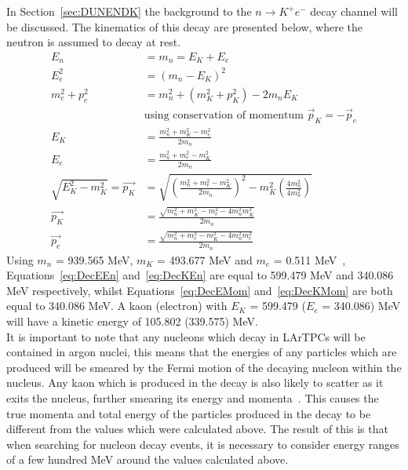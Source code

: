 In Section~\ref{sec:DUNENDK} the background to the $n \rightarrow K^{+} e^{-}$ decay channel will be discussed. The kinematics of this decay are presented below, where the neutron is assumed to decay at rest.
\begin{align}
  E_{n} &= m_{n} = E_{K} + E_{e} \nonumber \\
  E_{e}^{2} &= (m_{n} - E_{K})^{2} \nonumber \\
  m_{e}^{2} + p_{e}^{2} &= m_{n}^{2} + (m_{K}^{2} + p_{K}^{2}) - 2m_{n}E_{K} \nonumber \\
  &\text{using conservation of momentum $\vec{p}_{K} = -\vec{p}_{e}$} \nonumber \\  
  E_{K} &= \frac{m_n^{2} + m_{K}^{2} - m_{e}^{2}}{2m_{n}} \label{eq:DecKEn} \\
  E_{e} &= \frac{m_n^{2} + m_{e}^{2} - m_{K}^{2}}{2m_{n}} \label{eq:DecEEn} \\
  \sqrt{E_{K}^{2} - m_{K}^{2}} = \vec{p_{K}} &= \sqrt{ \left(\frac{m_n^{2} + m_{e}^{2} - m_{K}^{2}}{2m_{n}}\right)^{2} - m_{K}^{2}\left(\frac{4m_{n}^2}{4m_n^{2}}\right) } \nonumber \\
  \vec{p_{K}} &= \frac{ \sqrt{m_n^{2} + m_{K}^{2} - m_{e}^{2} - 4m_{n}^{2}m_{K}^{2} } }{ 2m_{n} } \label{eq:DecEMom} \\
  \vec{p_{e}} &= \frac{ \sqrt{m_n^{2} + m_{e}^{2} - m_{K}^{2} - 4m_{n}^{2}m_{e}^{2} } }{ 2m_{n} } \label{eq:DecKMom}
\end{align}
Using $m_{n}$ = 939.565 MeV, $m_{K}$ = 493.677 MeV and $m_{e}$ = 0.511 MeV~\citep{PDGReview}, Equations~\ref{eq:DecEEn} and~\ref{eq:DecKEn} are equal to 599.479 MeV and 340.086 MeV respectively, whilst Equations~\ref{eq:DecEMom} and~\ref{eq:DecKMom} are both equal to 340.086 MeV. A kaon (electron) with $E_{K}$ = 599.479 ($E_{e}$ = 340.086) MeV will have a kinetic energy of 105.802 (339.575) MeV. \\

It is important to note that any nucleons which decay in LArTPCs will be contained in argon nuclei, this means that the energies of any particles which are produced will be smeared by the Fermi motion of the decaying nucleon within the nucleus. Any kaon which is produced in the decay is also likely to scatter as it exits the nucleus, further smearing its energy and momenta~\citep{Stefan:2008zi}. This causes the true momenta and total energy of the particles produced in the decay to be different from the values which were calculated above. The result of this is that when searching for nucleon decay events, it is necessary to consider energy ranges of a few hundred MeV around the values calculated above. \\
